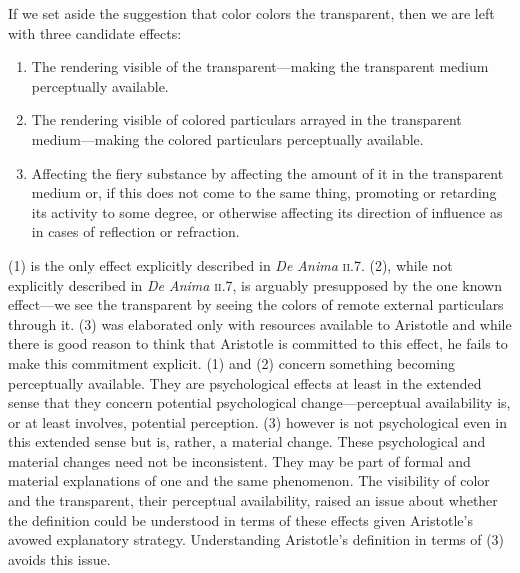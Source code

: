 If we set aside the suggestion that color colors the transparent, then we are left with three candidate effects:
\begin{enumerate}[(1)]
	\item The rendering visible of the transparent---making the transparent medium perceptually available.
	\item The rendering visible of colored particulars arrayed in the transparent medi\-um\----\-making the colored particulars perceptually available. 
	\item Affecting the fiery substance by affecting the amount of it in the transparent medium or, if this does not come to the same thing, promoting or retarding its activity to some degree, or otherwise affecting its direction of influence as in cases of reflection or refraction. 
\end{enumerate}
(1) is the only effect explicitly described in \emph{De Anima} \textsc{ii}.7. (2), while not explicitly described in \emph{De Anima} \textsc{ii}.7, is arguably presupposed by the one known effect---we see the transparent by seeing the colors of remote external particulars through it. (3) was elaborated only with resources available to Aristotle and while there is good reason to think that Aristotle is committed to this effect, he fails to make this commitment explicit. (1) and (2) concern something becoming perceptually available. They are psychological effects at least in the extended sense that they concern potential psychological change---perceptual availability is, or at least involves, potential perception. (3) however is not psychological even in this extended sense but is, rather, a material change. These psychological and material changes need not be inconsistent. They may be part of formal and material explanations of one and the same phenomenon. The visibility of color and the transparent, their perceptual availability, raised an issue about whether the definition could be understood in terms of these effects given Aristotle's avowed explanatory strategy. Understanding Aristotle's definition in terms of (3) avoids this issue. 

